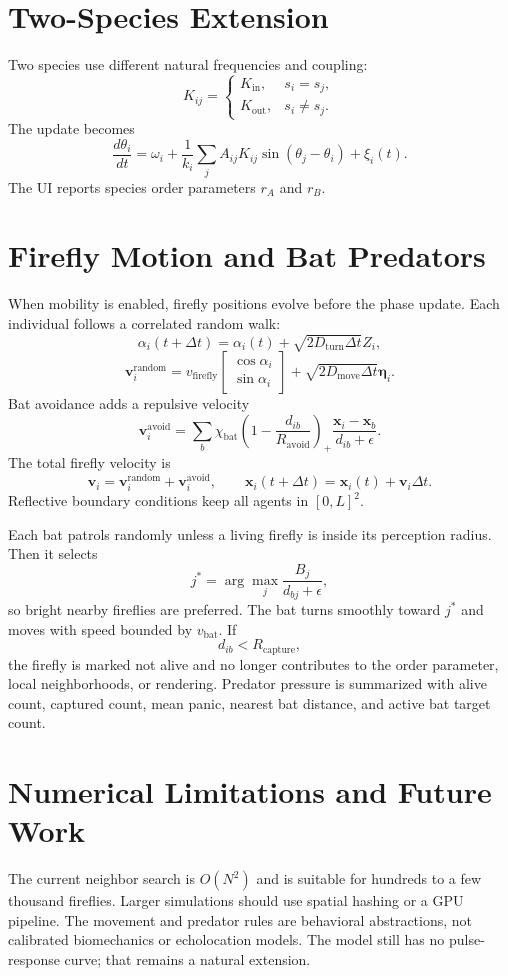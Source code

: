 \documentclass[11pt]{article}
\begin{document}
\section{Two-Species Extension}
Two species use different natural frequencies and coupling:
\[
K_{ij}=
\begin{cases}
K_{\mathrm{in}},&s_i=s_j,\\
K_{\mathrm{out}},&s_i\ne s_j.
\end{cases}
\]
The update becomes
\[
\frac{d\theta_i}{dt}=
\omega_i+\frac{1}{k_i}\sum_j A_{ij}K_{ij}\sin(\theta_j-\theta_i)+\xi_i(t).
\]
The UI reports species order parameters $r_A$ and $r_B$.

\section{Firefly Motion and Bat Predators}
When mobility is enabled, firefly positions evolve before the phase update. Each individual follows a correlated random walk:
\[
\alpha_i(t+\Delta t)=\alpha_i(t)+\sqrt{2D_{\mathrm{turn}}\Delta t}Z_i,
\]
\[
\mathbf{v}_i^{\mathrm{random}}=
v_{\mathrm{firefly}}
\begin{bmatrix}\cos\alpha_i\\ \sin\alpha_i\end{bmatrix}
+\sqrt{2D_{\mathrm{move}}\Delta t}\boldsymbol{\eta}_i.
\]
Bat avoidance adds a repulsive velocity
\[
\mathbf{v}_i^{\mathrm{avoid}}=
\sum_b
\chi_{\mathrm{bat}}\left(1-\frac{d_{ib}}{R_{\mathrm{avoid}}}\right)_+
\frac{\mathbf{x}_i-\mathbf{x}_b}{d_{ib}+\epsilon}.
\]
The total firefly velocity is
\[
\mathbf{v}_i=\mathbf{v}_i^{\mathrm{random}}+\mathbf{v}_i^{\mathrm{avoid}},
\qquad
\mathbf{x}_i(t+\Delta t)=\mathbf{x}_i(t)+\mathbf{v}_i\Delta t.
\]
Reflective boundary conditions keep all agents in $[0,L]^2$.

Each bat patrols randomly unless a living firefly is inside its perception radius. Then it selects
\[
j^*=\arg\max_j\frac{B_j}{d_{bj}+\epsilon},
\]
so bright nearby fireflies are preferred. The bat turns smoothly toward $j^*$ and moves with speed bounded by $v_{\mathrm{bat}}$. If
\[
d_{ib}<R_{\mathrm{capture}},
\]
the firefly is marked not alive and no longer contributes to the order parameter, local neighborhoods, or rendering. Predator pressure is summarized with alive count, captured count, mean panic, nearest bat distance, and active bat target count.

\section{Numerical Limitations and Future Work}
The current neighbor search is $O(N^2)$ and is suitable for hundreds to a few thousand fireflies. Larger simulations should use spatial hashing or a GPU pipeline. The movement and predator rules are behavioral abstractions, not calibrated biomechanics or echolocation models. The model still has no pulse-response curve; that remains a natural extension.



\end{document}
